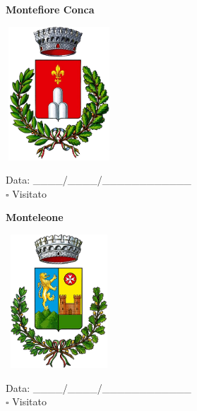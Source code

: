 \documentclass[a5paper,12pt]{article}
\begin{document}
\newpage

\noindent
\begin{minipage}[t]{0.45\textwidth}
    \begin{center}
        \textbf{Montefiore Conca}
    \end{center}
    \vspace{-0.5cm} %
    \begin{center}
        \includegraphics[height= 5cm, width=4cm]{Emilia Romagna/Stemma Montefiore Conca.png}
    \end{center}
    \vspace{-0.4cm} %
    \begin{flushleft}
        Data: \_\_\_\_/\_\_\_\_/\_\_\_\_\_\_\_\_\_\_\_\_ \\
        $\square$ Visitato
    \end{flushleft}
\end{minipage}
\hfill
\noindent
\begin{minipage}[t]{0.45\textwidth}
    \begin{center}
        \textbf{Monteleone}
    \end{center}
    \vspace{-0.5cm} %
    \begin{center}
        \includegraphics[height= 5cm, width=4cm]{Emilia Romagna/Stemma Monteleone.png}
    \end{center}
    \vspace{-0.4cm} %
    \begin{flushleft}
        Data: \_\_\_\_/\_\_\_\_/\_\_\_\_\_\_\_\_\_\_\_\_ \\
        $\square$ Visitato
    \end{flushleft}
\end{minipage}
\end{document}
